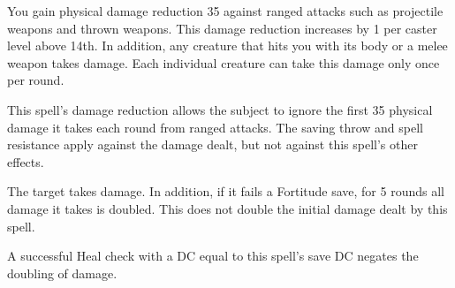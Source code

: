 \begin{spelleffect}
  You gain physical damage reduction 35 against ranged attacks such as projectile weapons and thrown weapons. This damage reduction increases by 1 per caster level above 14th. In addition, any creature that hits you with its body or a melee weapon takes damage. Each individual creature can take this damage only once per round.
\end{spelleffect}
\begin{spellnotes}
    This spell's damage reduction allows the subject to ignore the first 35 physical damage it takes each round from ranged attacks. The saving throw and spell resistance apply against the damage dealt, but not against this spell's other effects.
\end{spellnotes}

\spellrng{\rngclose}
\begin{spelleffect}
  The target takes damage. In addition, if it fails a Fortitude save, for 5 rounds all damage it takes is doubled. This does not double the initial damage dealt by this spell.
\end{spelleffect}
\begin{spellnotes}
  A successful Heal check with a DC equal to this spell's save DC negates the doubling of damage. 
\end{spellnotes}

